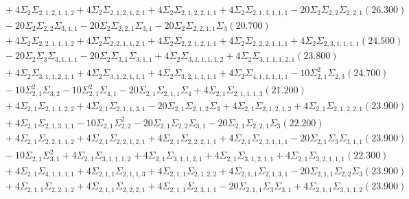 \documentclass[12pt]{article}
\begin{document}
\begin{landscape}
\begin{align*}
		&\quad\quad +4\Sigma_{2}\Sigma_{2,1,2,1,1,2}+4\Sigma_{2}\Sigma_{2,1,2,1,2,1}+4\Sigma_{2}\Sigma_{2,1,2,2,1,1}+4\Sigma_{2}\Sigma_{2,1,3,1,1,1}-20\Sigma_{2}\Sigma_{2,2}\Sigma_{2,2,1}(26.300) \\ 
		&\quad\quad -20\Sigma_{2}\Sigma_{2,2}\Sigma_{3,1,1}-20\Sigma_{2}\Sigma_{2,2,1}\Sigma_{3,1}-20\Sigma_{2}\Sigma_{2,2,1,1}\Sigma_{3}(20.700) \\ 
		&\quad\quad +4\Sigma_{2}\Sigma_{2,2,1,1,1,2}+4\Sigma_{2}\Sigma_{2,2,1,1,2,1}+4\Sigma_{2}\Sigma_{2,2,1,2,1,1}+4\Sigma_{2}\Sigma_{2,2,2,1,1,1}+4\Sigma_{2}\Sigma_{2,3,1,1,1,1}(24.500) \\ 
		&\quad\quad -20\Sigma_{2}\Sigma_{3}\Sigma_{3,1,1,1}-20\Sigma_{2}\Sigma_{3,1}\Sigma_{3,1,1}+4\Sigma_{2}\Sigma_{3,1,1,1,1,2}+4\Sigma_{2}\Sigma_{3,1,1,1,2,1}(23.800) \\ 
		&\quad\quad +4\Sigma_{2}\Sigma_{3,1,1,2,1,1}+4\Sigma_{2}\Sigma_{3,1,2,1,1,1}+4\Sigma_{2}\Sigma_{3,2,1,1,1,1}+4\Sigma_{2}\Sigma_{4,1,1,1,1,1}-10\Sigma_{2,1}^{2}\Sigma_{2,3}(24.700) \\ 
		&\quad\quad -10\Sigma_{2,1}^{2}\Sigma_{3,2}-10\Sigma_{2,1}^{2}\Sigma_{4,1}-20\Sigma_{2,1}\Sigma_{2,1,1}\Sigma_{4}+4\Sigma_{2,1}\Sigma_{2,1,1,1,3}(21.200) \\ 
		&\quad\quad +4\Sigma_{2,1}\Sigma_{2,1,1,2,2}+4\Sigma_{2,1}\Sigma_{2,1,1,3,1}-20\Sigma_{2,1}\Sigma_{2,1,2}\Sigma_{3}+4\Sigma_{2,1}\Sigma_{2,1,2,1,2}+4\Sigma_{2,1}\Sigma_{2,1,2,2,1}(23.900) \\ 
		&\quad\quad +4\Sigma_{2,1}\Sigma_{2,1,3,1,1}-10\Sigma_{2,1}\Sigma_{2,2}^{2}-20\Sigma_{2,1}\Sigma_{2,2}\Sigma_{3,1}-20\Sigma_{2,1}\Sigma_{2,2,1}\Sigma_{3}(22.200) \\ 
		&\quad\quad +4\Sigma_{2,1}\Sigma_{2,2,1,1,2}+4\Sigma_{2,1}\Sigma_{2,2,1,2,1}+4\Sigma_{2,1}\Sigma_{2,2,2,1,1}+4\Sigma_{2,1}\Sigma_{2,3,1,1,1}-20\Sigma_{2,1}\Sigma_{3}\Sigma_{3,1,1}(23.900) \\ 
		&\quad\quad -10\Sigma_{2,1}\Sigma_{3,1}^{2}+4\Sigma_{2,1}\Sigma_{3,1,1,1,2}+4\Sigma_{2,1}\Sigma_{3,1,1,2,1}+4\Sigma_{2,1}\Sigma_{3,1,2,1,1}+4\Sigma_{2,1}\Sigma_{3,2,1,1,1}(22.300) \\ 
		&\quad\quad +4\Sigma_{2,1}\Sigma_{4,1,1,1,1}+4\Sigma_{2,1,1}\Sigma_{2,1,1,3}+4\Sigma_{2,1,1}\Sigma_{2,1,2,2}+4\Sigma_{2,1,1}\Sigma_{2,1,3,1}-20\Sigma_{2,1,1}\Sigma_{2,2}\Sigma_{3}(23.900) \\ 
		&\quad\quad +4\Sigma_{2,1,1}\Sigma_{2,2,1,2}+4\Sigma_{2,1,1}\Sigma_{2,2,2,1}+4\Sigma_{2,1,1}\Sigma_{2,3,1,1}-20\Sigma_{2,1,1}\Sigma_{3}\Sigma_{3,1}+4\Sigma_{2,1,1}\Sigma_{3,1,1,2}(23.900) \\ 

\end{align*}
\end{landscape}
\end{document}

